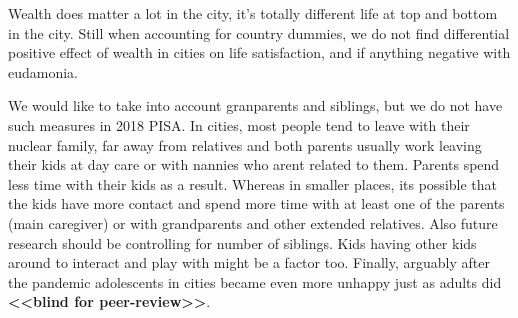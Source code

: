 \documentclass[10pt, letterpaper]{article}
\begin{document}
\begin{spacing}{1.4}
Wealth does matter a lot in the city, it's totally different life at top and
bottom in the city. Still when accounting for country dummies, we do not find
differential positive effect of wealth in cities on life satisfaction, and if
anything negative with eudamonia. 

We would  like to take into account granparents and siblings, but we do not have
such measures in 2018 PISA. %
 In cities, most people tend to leave with their nuclear family, far away from
 relatives and both parents usually work leaving their kids at day care or with
 nannies who arent related to them. Parents spend less time with their kids as a
 result. Whereas in smaller places, its possible that the kids have more contact
 and spend more time with at least one of the parents (main caregiver) or with
 grandparents and other extended relatives. 
 Also future research should be  controlling for number of siblings. Kids having other kids around to interact and play with might be a factor too.
 Finally, arguably after the pandemic adolescents in cities became even more unhappy just as adults did
\textbf{<<blind for peer-review>>}. 

                                                       


    

\end{spacing}
\end{document}
